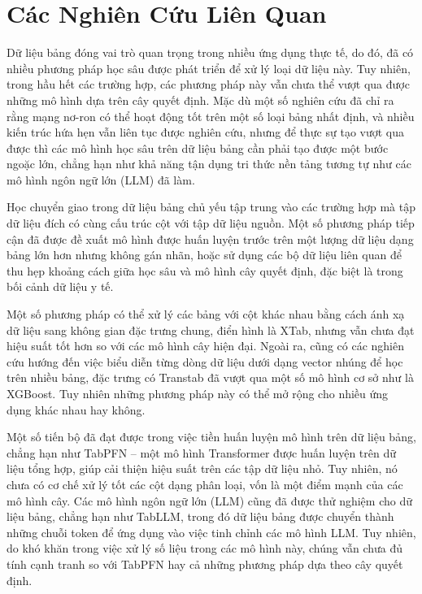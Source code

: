 \documentclass{article}
\begin{document}
\section{Các Nghiên Cứu Liên Quan}
Dữ liệu bảng đóng vai trò quan trọng trong nhiều ứng dụng thực tế, do đó, đã có nhiều phương pháp học sâu được phát triển để xử lý loại dữ liệu này. Tuy nhiên, trong hầu hết các trường hợp, các phương pháp này vẫn chưa thể vượt qua được những mô hình dựa trên cây quyết định. Mặc dù một số nghiên cứu đã chỉ ra rằng mạng nơ-ron có thể hoạt động tốt trên một số loại bảng nhất định, và nhiều kiến trúc hứa hẹn vẫn liên tục được nghiên cứu, nhưng để thực sự tạo vượt qua được thì các mô hình học sâu trên dữ liệu bảng cần phải tạo được một bước ngoặc lớn, chẳng hạn như khả năng tận dụng tri thức nền tảng tương tự như các mô hình ngôn ngữ lớn (LLM) đã làm.

Học chuyển giao trong dữ liệu bảng chủ yếu tập trung vào các trường hợp mà tập dữ liệu đích có cùng cấu trúc cột với tập dữ liệu nguồn. Một số phương pháp tiếp cận đã được đề xuất mô hình được huấn luyện trước trên một lượng dữ liệu dạng bảng lớn hơn nhưng không gán nhãn, hoặc sử dụng các bộ dữ liệu liên quan để thu hẹp khoảng cách giữa học sâu và mô hình cây quyết định, đặc biệt là trong bối cảnh dữ liệu y tế. 

Một số phương pháp có thể xử lý các bảng với cột khác nhau bằng cách ánh xạ dữ liệu sang không gian đặc trưng chung, điển hình là XTab, nhưng vẫn chưa đạt hiệu suất tốt hơn so với các mô hình cây hiện đại. Ngoài ra, cũng có các nghiên cứu hướng đến việc biểu diễn từng dòng dữ liệu dưới dạng vector nhúng để học trên nhiều bảng, đặc trưng có Transtab đã vượt qua một số mô hình cơ sở như là XGBoost. Tuy nhiên những phương pháp này có thể mở rộng cho nhiều ứng dụng khác nhau hay không.

Một số tiến bộ đã đạt được trong việc tiền huấn luyện mô hình trên dữ liệu bảng, chẳng hạn như TabPFN – một mô hình Transformer được huấn luyện trên dữ liệu tổng hợp, giúp cải thiện hiệu suất trên các tập dữ liệu nhỏ. Tuy nhiên, nó chưa có cơ chế xử lý tốt các cột dạng phân loại, vốn là một điểm mạnh của các mô hình cây. Các mô hình ngôn ngữ lớn (LLM) cũng đã được thử nghiệm cho dữ liệu bảng, chẳng hạn như TabLLM, trong đó dữ liệu bảng được chuyển thành những chuỗi token để ứng dụng vào việc tinh chỉnh các mô hình LLM. Tuy nhiên, do khó khăn trong việc xử lý số liệu trong các mô hình này, chúng vẫn chưa đủ tính cạnh tranh so với TabPFN hay cả những phương pháp dựa theo cây quyết định. 
\end{document}
